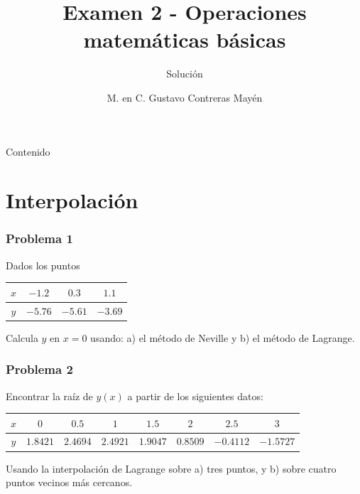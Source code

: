 


\title{Examen 2 - Operaciones matemáticas básicas}
\subtitle{Soluci\'{o}n}
\author[]{M. en C. Gustavo Contreras Mayén}
\maketitle
\fontsize{14}{14}\selectfont
{}
\begin{frame}{Contenido}
\tableofcontents[pausesections]
\end{frame}
\section{Interpolación}
\begin{frame}[fragile]
\frametitle{Problema 1}
Dados los puntos
\begin{table}[H]
	\centering 
	\begin{large}
		\begin{tabulary}{15cm}{c | c | c | c  }\normalsize
			$x$ & $-1.2$ & $0.3$ & $1.1$ \\
			\midrule
			$y$ & $-5.76$ & $-5.61$ & $-3.69$
		\end{tabulary}
	\end{large}
\end{table}
Calcula $y$ en $x=0$ usando: a) el método de Neville y b) el método de Lagrange.
\\
\medskip
{}
\end{frame}
\begin{frame}
\frametitle{Problema 2}
Encontrar la raíz de $y(x)$ a partir de los siguientes datos:
\fontsize{10}{10}\selectfont
\begin{table}[H] 
	\centering 
		\begin{tabulary}{15cm}{c | c | c | c | c | c | c | c }
			$x$ & $0$ & $0.5$ & $1$ & $1.5$ & $2$ & $2.5$ & $3$ \\
			\midrule
			$y$ & $1.8421$ & $2.4694$ & $2.4921$ & $1.9047$ & $0.8509$ & $-0.4112$ & $-1.5727$ 
			\end{tabulary}
	\end{table}
\fontsize{14}{14}\selectfont
Usando la interpolación de Lagrange sobre a) tres puntos, y b) sobre cuatro puntos vecinos más cercanos.
\end{frame}
